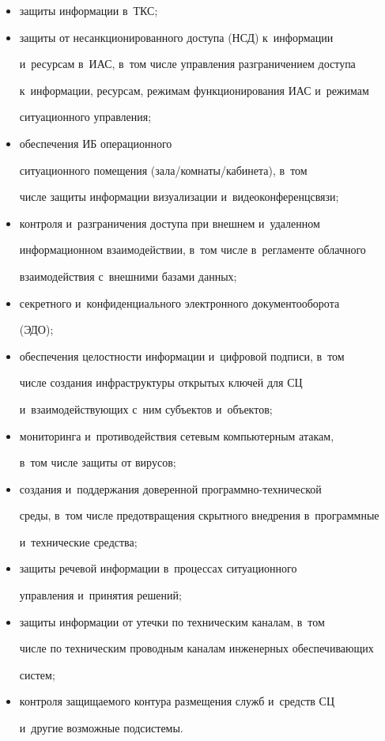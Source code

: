     \begin{itemize}

    \item  защиты информации в~ТКС;

    \item защиты от несанкционированного доступа (НСД) к~информации 

и~ресурсам в~ИАС, в~том числе управления разграничением доступа 

к~информации, ресурсам, режимам функционирования ИАС и~режимам 

ситуационного управ\-ления;

    \item обеспечения ИБ операционного 

ситуационного помещения (за\-ла\!/\!ком\-на\-ты\!/\!ка\-би\-не\-та), в~том 

числе защиты информации визуализации и~видеоконференцсвязи;

    \item контроля и~разграничения доступа при внешнем и~удаленном 

информационном взаимодействии, в~том числе в~регламенте облачного 

взаимодействия с~внешними базами данных;

    \item секретного и~конфиденциального электронного документооборота 

(ЭДО);

    \item обеспечения целостности информации и~цифровой подписи, в~том 

числе создания инфраструктуры открытых ключей для СЦ 

и~взаимодействующих с~ним субъектов и~объектов;

    \item мониторинга и~противодействия сетевым компьютерным атакам, 

в~том числе защиты от вирусов;

    \item создания и~поддержания доверенной про\-граммно-тех\-ни\-че\-ской 

среды, в~том числе предотвращения скрытного внедрения в~программные 

и~технические средства;

    \item защиты речевой информации в~процессах ситуационного 

управления и~принятия решений;

    \item защиты информации от утечки по техническим каналам, в~том 

числе по техническим проводным каналам инженерных обеспечивающих 

сис\-тем;

    \item контроля защищаемого контура размещения служб и~средств СЦ 

и~другие возможные под\-сис\-темы.

    \end{itemize}

